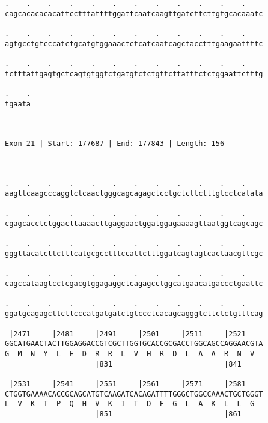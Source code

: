\documentclass{article}
\begin{document}
\begin{Verbatim}
.    .    .    .    .    .    .    .    .    .    .    .    
cagcacacacacattcctttattttggattcaatcaagttgatcttcttgtgcacaaatc
                                                            
.    .    .    .    .    .    .    .    .    .    .    .    
agtgcctgtcccatctgcatgtggaaactctcatcaatcagctacctttgaagaattttc
                                                            
.    .    .    .    .    .    .    .    .    .    .    .    
tctttattgagtgctcagtgtggtctgatgtctctgttcttatttctctggaattctttg
                                                            
.    .
tgaata
      
      
 
Exon 21 | Start: 177687 | End: 177843 | Length: 156



.    .    .    .    .    .    .    .    .    .    .    .    
aagttcaagcccaggtctcaactgggcagcagagctcctgctcttctttgtcctcatata
                                                            
.    .    .    .    .    .    .    .    .    .    .    .    
cgagcacctctggacttaaaacttgaggaactggatggagaaaagttaatggtcagcagc
                                                            
.    .    .    .    .    .    .    .    .    .    .    .    
gggttacatcttctttcatgcgcctttccattctttggatcagtagtcactaacgttcgc
                                                            
.    .    .    .    .    .    .    .    .    .    .    .    
cagccataagtcctcgacgtggagaggctcagagcctggcatgaacatgaccctgaattc
                                                            
.    .    .    .    .    .    .    .    .    .    .    .    
ggatgcagagcttcttcccatgatgatctgtccctcacagcagggtcttctctgtttcag
                                                            
 |2471     |2481     |2491     |2501     |2511     |2521    
GGCATGAACTACTTGGAGGACCGTCGCTTGGTGCACCGCGACCTGGCAGCCAGGAACGTA
G  M  N  Y  L  E  D  R  R  L  V  H  R  D  L  A  A  R  N  V  
                     |831                          |841     
  
 |2531     |2541     |2551     |2561     |2571     |2581    
CTGGTGAAAACACCGCAGCATGTCAAGATCACAGATTTTGGGCTGGCCAAACTGCTGGGT
L  V  K  T  P  Q  H  V  K  I  T  D  F  G  L  A  K  L  L  G  
                     |851                          |861     
  

\end{Verbatim}
\end{document}
